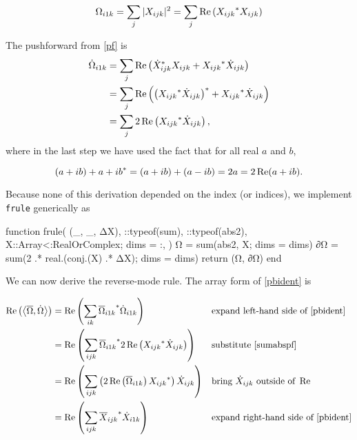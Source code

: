 \documentclass[../../main.tex]{subfiles}
\begin{document}
\begin{refsection}
\[\Omega_{i1k} = \sum_{j} |X_{ijk}|^2
	= \sum_{j} \Re \left(
	{ X_{ijk} }^* X_{ijk}
	\right)\]

The pushforward from \eqref{pf} is
\begin{align}
	\dot{\Omega}_{i1k}
	 & = \sum_j \Re\left(
	{ \dot{X}_{ijk} }^* X_{ijk} +
	{ X_{ijk} }^* \dot{X}_{ijk} \right) \nonumber \\
	 & = \sum_j \Re\left(
	{\left(
		{ X_{ijk} }^* \dot{X}_{ijk}
		\right)}^* +
	{X_{ijk}}^* \dot{X}_{ijk}
	\right) \nonumber                                 \\
	 & = \sum_j 2 \Re\left(
	{ X_{ijk} }^* \dot{X}_{ijk}
	\right), \label{sumabspf}
\end{align}
where in the last step we have used the fact that for all real $a$ and $b$,

\[(a + i b) + {a + i b}^*
	= (a + i b) + (a - i b)
	= 2 a
	= 2 \Re (a + i b).\]

Because none of this derivation depended on the index (or indices), we implement \texttt{frule} generically as
\begin{juliacode}
function frule(
    (_, _, ΔX),
    ::typeof(sum),
    ::typeof(abs2),
    X::Array{<:RealOrComplex};
    dims = :,
)
    Ω = sum(abs2, X; dims = dims)
    ∂Ω = sum(2 .* real.(conj.(X) .* ΔX); dims = dims)
    return (Ω, ∂Ω)
end
\end{juliacode}
We can now derive the reverse-mode rule.
The array form of \eqref{pbident} is

\begingroup
\allowdisplaybreaks
\begin{align*}
	\Re\left( \left\langle  \overline{\Omega} ,  \dot{\Omega}  \right\rangle \right)
	 & = \Re \left( \sum_{ik}
	{ \overline{\Omega}_{i1k} }^* \dot{\Omega}_{i1k}
	\right)
	 &                         & \text{expand left-hand side of } \eqref{pbident}     \\
	 & = \Re \left(\sum_{ijk}
	{ \overline{\Omega}_{i1k} }^*
	2 \Re\left(
	{ X_{ijk} }^* \dot{X}_{ijk}
	\right)
	\right)
	 &                         & \text{substitute } \eqref{sumabspf}                  \\
	 & = \Re \left( \sum_{ijk}
	\left(
		2 \Re \left( \overline{\Omega}_{i1k} \right)
		{ X_{ijk} }^*
		\right) \dot{X}_{ijk}
	\right)
	 &                         & \text{bring } \dot{X}_{ijk} \text{ outside of } \Re \\
	 & = \Re \left( \sum_{ijk}
	{ \overline{X}_{ijk} }^* \dot{X}_{i1k}
	\right)
	 &                         & \text{expand right-hand side of } \eqref{pbident}
\end{align*}
\endgroup


\end{refsection}
\end{document}
